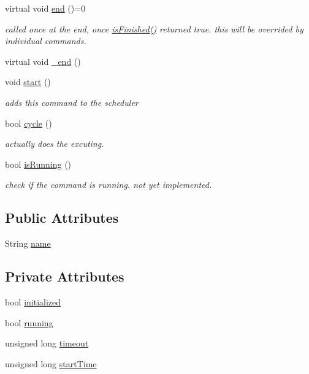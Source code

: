 \begin{DoxyCompactItemize}
virtual void \hyperlink{classCommand_abed8b7871ba1078bc10056cac5b471be}{end} ()=0
\begin{DoxyCompactList}\small\item\em called once at the end, once \hyperlink{classCommand_a9aa704d5f9d98f510a79e645701dc72a}{is\-Finished()} returned true. this will be overrided by individual commands. \end{DoxyCompactList}\item 
virtual void \hyperlink{classCommand_a9173c74652cb69c8807170bf16151ae2}{\-\_\-end} ()
\item 
void \hyperlink{classCommand_aef139180669b92534dd05a89323fb82f}{start} ()
\begin{DoxyCompactList}\small\item\em adds this command to the scheduler \end{DoxyCompactList}\item 
bool \hyperlink{classCommand_a93e75689d86c0a8675c1f769f721d646}{cycle} ()
\begin{DoxyCompactList}\small\item\em actually does the excuting. \end{DoxyCompactList}\item 
bool \hyperlink{classCommand_a0252c920dd7114c29ef04526cfd0f39a}{is\-Running} ()
\begin{DoxyCompactList}\small\item\em check if the command is running. not yet implemented. \end{DoxyCompactList}\end{DoxyCompactItemize}
\subsection*{Public Attributes}
\begin{DoxyCompactItemize}
\item 
String \hyperlink{classCommand_a19f7ad73ca8599ad47f9b7bcccc52610}{name}
\end{DoxyCompactItemize}
\subsection*{Private Attributes}
\begin{DoxyCompactItemize}
\item 
bool \hyperlink{classCommand_aa9dd747d430f9367da9b17545404f79e}{initialized}
\item 
bool \hyperlink{classCommand_a8e31897f049af332a2421c9721fda18b}{running}
\item 
unsigned long \hyperlink{classCommand_a687b30a3d41c93f91dfba5a88c98f270}{timeout}
\item 
unsigned long \hyperlink{classCommand_af537856a06286a62d7200d84f901c72e}{start\-Time}
\end{DoxyCompactItemize}



